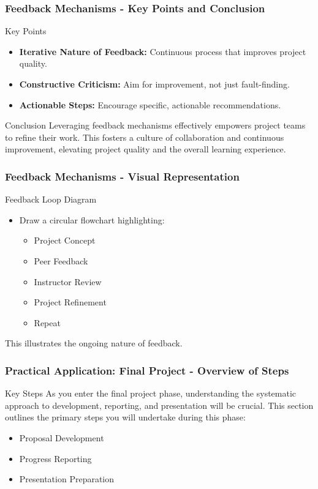 \documentclass[aspectratio=169]{beamer}
\begin{document}
\begin{frame}[fragile]
    \frametitle{Feedback Mechanisms - Key Points and Conclusion}
    \begin{block}{Key Points}
        \begin{itemize}
            \item \textbf{Iterative Nature of Feedback:} Continuous process that improves project quality.
            \item \textbf{Constructive Criticism:} Aim for improvement, not just fault-finding.
            \item \textbf{Actionable Steps:} Encourage specific, actionable recommendations.
        \end{itemize}
    \end{block}

    \begin{block}{Conclusion}
        Leveraging feedback mechanisms effectively empowers project teams to refine their work. This fosters a culture of collaboration and continuous improvement, elevating project quality and the overall learning experience.
    \end{block}
\end{frame}

\begin{frame}[fragile]
    \frametitle{Feedback Mechanisms - Visual Representation}
    \begin{block}{Feedback Loop Diagram}
        \begin{itemize}
            \item Draw a circular flowchart highlighting: 
            \begin{itemize}
                \item Project Concept 
                \item Peer Feedback 
                \item Instructor Review 
                \item Project Refinement 
                \item Repeat
            \end{itemize}
        \end{itemize}
        This illustrates the ongoing nature of feedback.
    \end{block}
\end{frame}

\begin{frame}[fragile]
    \frametitle{Practical Application: Final Project - Overview of Steps}
    \begin{block}{Key Steps}
        As you enter the final project phase, understanding the systematic approach to development, reporting, and presentation will be crucial. 
        This section outlines the primary steps you will undertake during this phase:
    \end{block}
    \begin{itemize}
        \item Proposal Development
        \item Progress Reporting
        \item Presentation Preparation
    \end{itemize}
\end{frame}
\end{document}

